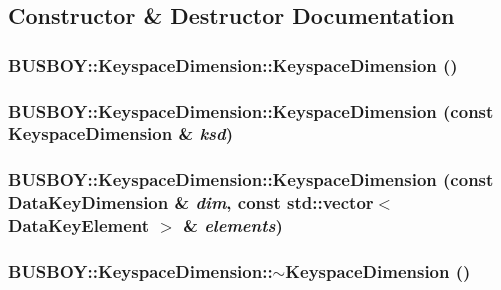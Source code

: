 \subsection{Constructor \& Destructor Documentation}
\hypertarget{classBUSBOY_1_1KeyspaceDimension_a55af6f7bfa6bd312170c1f86947ccfd7}{
\subsubsection[{KeyspaceDimension}]{\setlength{\rightskip}{0pt plus 5cm}BUSBOY::KeyspaceDimension::KeyspaceDimension ()}}
\label{classBUSBOY_1_1KeyspaceDimension_a55af6f7bfa6bd312170c1f86947ccfd7}
\hypertarget{classBUSBOY_1_1KeyspaceDimension_a27ca5fae9ad35acbb035846a3b3557d2}{
\subsubsection[{KeyspaceDimension}]{\setlength{\rightskip}{0pt plus 5cm}BUSBOY::KeyspaceDimension::KeyspaceDimension (const {\bf KeyspaceDimension} \& {\em ksd})}}
\label{classBUSBOY_1_1KeyspaceDimension_a27ca5fae9ad35acbb035846a3b3557d2}
\hypertarget{classBUSBOY_1_1KeyspaceDimension_a562028c48d62066cb8ebd75c1310d83b}{
\subsubsection[{KeyspaceDimension}]{\setlength{\rightskip}{0pt plus 5cm}BUSBOY::KeyspaceDimension::KeyspaceDimension (const {\bf DataKeyDimension} \& {\em dim}, \/  const std::vector$<$ {\bf DataKeyElement} $>$ \& {\em elements})}}
\label{classBUSBOY_1_1KeyspaceDimension_a562028c48d62066cb8ebd75c1310d83b}
\hypertarget{classBUSBOY_1_1KeyspaceDimension_a8bd7f67bb399d7cf9b80be6160e7daf7}{
\subsubsection[{$\sim$KeyspaceDimension}]{\setlength{\rightskip}{0pt plus 5cm}BUSBOY::KeyspaceDimension::$\sim$KeyspaceDimension ()}}
\label{classBUSBOY_1_1KeyspaceDimension_a8bd7f67bb399d7cf9b80be6160e7daf7}


